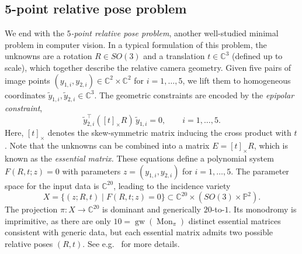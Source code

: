 \documentclass[11pt]{amsart}
\let\oldtextit\textit
\renewcommand\emph[1]{\oldtextit{\color{blue}#1}}
\theoremstyle{definition}
\theoremstyle{remark}
\DeclareMathOperator{\Mon}{Mon}
\DeclareMathOperator{\gw}{gw}
\begin{document}
\subsection{5-point relative pose problem}\label{subsec:5pp} 

We end with the \emph{$5$-point relative pose problem}, another well-studied minimal problem in computer vision.
In a typical formulation of this problem, the unknowns are a rotation $R \in SO(3)$ and a translation $t \in \mathbb{C}^3$ (defined up to scale), which together describe the relative camera geometry. Given five pairs of image points $(y_{1,i}, y_{2,i}) \in \mathbb{C}^2 \times \mathbb{C}^2$ for $i=1,\dots, 5$, we lift them to homogeneous coordinates $\tilde y_{1,i}, \tilde y_{2,i} \in \mathbb{C}^3$. The geometric constraints are encoded by the \emph{epipolar constraint}, 
\begin{equation}\label{eq:epipolar-constraint}
\tilde y_{2,i}^\top ([t]_\times R) \, \tilde y_{1,i} = 0, \qquad i=1,\dots,5.
\end{equation}
Here, $[t]_\times$ denotes the skew-symmetric matrix inducing the cross product with $t$. 
Note that the unknowns can be combined into a matrix $E=[t]_\times R$, which is known as the \emph{essential matrix.}
These equations define a polynomial system $F(R, t; z) = 0$ with parameters $z = (y_{1,i}, y_{2,i})$ for $i=1,\dots,5$. The parameter space for the input data is $\mathbb{C}^{20}$, leading to the incidence variety
\[
X = \{(z;R, t) \mid F(R, t; z)=0\} \subset \mathbb{C}^{20} \times (SO(3) \times \mathbb{P}^2).
\]
The projection $\pi : X \to \mathbb{C}^{20}$ is dominant and generically $20$-to-$1$. 
Its monodromy is imprimitive, as there are only $10= \gw (\Mon_\pi)$ distinct essential matrices consistent with generic data, but each essential matrix admits two possible relative poses $(R,t).$ See e.g.~\cite{stewenius2006recent} for more details.
\end{document}
